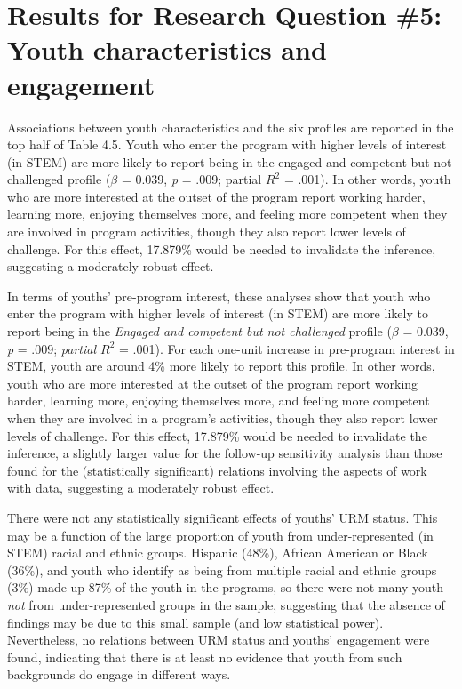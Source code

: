\documentclass[]{msu-thesis}
\theoremstyle{definition}
\theoremstyle{definition}
\theoremstyle{definition}
\theoremstyle{remark}
\begin{document}
\section{Results for Research Question \#5: Youth characteristics and
engagement}\label{results-for-research-question-5-youth-characteristics-and-engagement}

Associations between youth characteristics and the six profiles are
reported in the top half of Table 4.5. Youth who enter the program with
higher levels of interest (in STEM) are more likely to report being in
the engaged and competent but not challenged profile (\(\beta\) = 0.039,
\emph{p} = .009; partial \(R^2\) = .001). In other words, youth who are
more interested at the outset of the program report working harder,
learning more, enjoying themselves more, and feeling more competent when
they are involved in program activities, though they also report lower
levels of challenge. For this effect, 17.879\% would be needed to
invalidate the inference, suggesting a moderately robust effect.

In terms of youths' pre-program interest, these analyses show that youth
who enter the program with higher levels of interest (in STEM) are more
likely to report being in the \emph{Engaged and competent but not
challenged} profile (\(\beta\) = 0.039, \emph{p} = .009; \emph{partial
\(R^2\)} = .001). For each one-unit increase in pre-program interest in
STEM, youth are around 4\% more likely to report this profile. In other
words, youth who are more interested at the outset of the program report
working harder, learning more, enjoying themselves more, and feeling
more competent when they are involved in a program's activities, though
they also report lower levels of challenge. For this effect, 17.879\%
would be needed to invalidate the inference, a slightly larger value for
the follow-up sensitivity analysis than those found for the
(statistically significant) relations involving the aspects of work with
data, suggesting a moderately robust effect.

There were not any statistically significant effects of youths' URM
status. This may be a function of the large proportion of youth from
under-represented (in STEM) racial and ethnic groups. Hispanic (48\%),
African American or Black (36\%), and youth who identify as being from
multiple racial and ethnic groups (3\%) made up 87\% of the youth in the
programs, so there were not many youth \emph{not} from under-represented
groups in the sample, suggesting that the absence of findings may be due
to this small sample (and low statistical power). Nevertheless, no
relations between URM status and youths' engagement were found,
indicating that there is at least no evidence that youth from such
backgrounds do engage in different ways.
\end{document}
